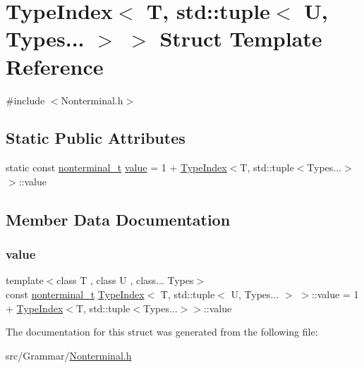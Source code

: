 \hypertarget{struct_type_index_3_01_t_00_01std_1_1tuple_3_01_u_00_01_types_8_8_8_01_4_01_4}{}\section{Type\+Index$<$ T, std\+:\+:tuple$<$ U, Types... $>$ $>$ Struct Template Reference}
\label{struct_type_index_3_01_t_00_01std_1_1tuple_3_01_u_00_01_types_8_8_8_01_4_01_4}


{\ttfamily \#include $<$Nonterminal.\+h$>$}

\subsection*{Static Public Attributes}
\begin{DoxyCompactItemize}
\item 
static const \hyperlink{_nonterminal_8h_a5c1f658dc7560600a16d22408bd716ca}{nonterminal\+\_\+t} \hyperlink{struct_type_index_3_01_t_00_01std_1_1tuple_3_01_u_00_01_types_8_8_8_01_4_01_4_a87bb4c7885986ec91881b421ad1758b7}{value} = 1 + \hyperlink{struct_type_index}{Type\+Index}$<$T, std\+::tuple$<$Types...$>$$>$\+::value
\end{DoxyCompactItemize}


\subsection{Member Data Documentation}
\mbox{\label{struct_type_index_3_01_t_00_01std_1_1tuple_3_01_u_00_01_types_8_8_8_01_4_01_4_a87bb4c7885986ec91881b421ad1758b7}} 
\subsubsection{\texorpdfstring{value}{value}}
{\footnotesize\ttfamily template$<$class T , class U , class... Types$>$ \\
const \hyperlink{_nonterminal_8h_a5c1f658dc7560600a16d22408bd716ca}{nonterminal\+\_\+t} \hyperlink{struct_type_index}{Type\+Index}$<$ T, std\+::tuple$<$ U, Types... $>$ $>$\+::value = 1 + \hyperlink{struct_type_index}{Type\+Index}$<$T, std\+::tuple$<$Types...$>$$>$\+::value\hspace{0.3cm}{\ttfamily [static]}}



The documentation for this struct was generated from the following file\+:\begin{DoxyCompactItemize}
\item 
src/\+Grammar/\hyperlink{_nonterminal_8h}{Nonterminal.\+h}\end{DoxyCompactItemize}
